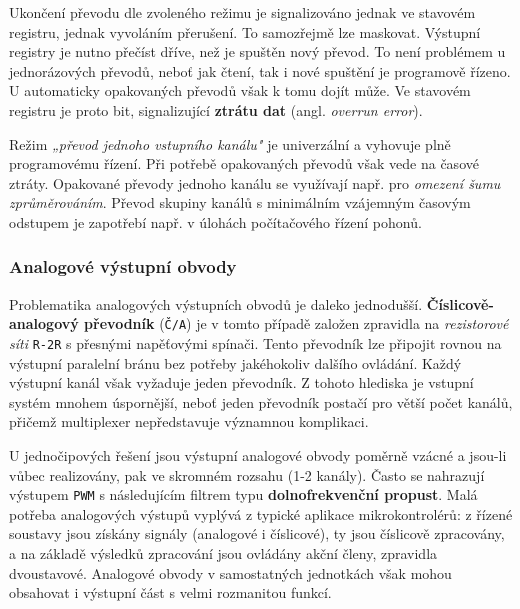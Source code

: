       Ukončení převodu dle zvoleného režimu je signalizováno jednak ve stavovém registru, jednak 
      vyvoláním přerušení. To samozřejmě lze maskovat. Výstupní registry je nutno přečíst dříve, 
      než je spuštěn nový převod. To není problémem u jednorázových převodů, neboť jak čtení, tak i 
      nové spuštění je programově řízeno. U automaticky opakovaných převodů však k tomu dojít může. 
      Ve stavovém registru je proto bit, signalizující \textbf{ztrátu dat} (angl. \emph{overrun 
      error}).
      
      Režim \emph{„převod jednoho vstupního kanálu"} je univerzální a vyhovuje plně programovému 
      řízení. Při potřebě opakovaných převodů však vede na časové ztráty. Opakované převody jednoho 
      kanálu se využívají např. pro \emph{omezení šumu zprůměrováním}. Převod skupiny kanálů s 
      minimálním vzájemným časovým odstupem je zapotřebí např. v úlohách počítačového řízení 
      pohonů.    
      
      \subsubsection{Analogové výstupní obvody}
        Problematika analogových výstupních obvodů je daleko jednodušší. 
        \textbf{Číslicově-analogový převodník} (\texttt{Č/A}) je v tomto případě založen zpravidla 
        na \emph{rezistorové síti} \texttt{R-2R} s přesnými napěťovými spínači. Tento převodník lze 
        připojit rovnou na výstupní paralelní bránu bez potřeby jakéhokoliv dalšího ovládání. Každý 
        výstupní kanál však vyžaduje jeden převodník. Z tohoto hlediska je vstupní systém mnohem 
        úspornější, neboť jeden převodník postačí pro větší počet kanálů, přičemž multiplexer 
        nepředstavuje významnou komplikaci.
        
        U jednočipových řešení jsou výstupní analogové obvody poměrně vzácné a jsou-li vůbec 
        realizovány, pak ve skromném rozsahu (1-2 kanály). Často se nahrazují výstupem \texttt{PWM} 
        s následujícím filtrem typu \textbf{dolnofrekvenční propust}. Malá potřeba analogových 
        výstupů vyplývá z typické aplikace mikrokontrolérů: z řízené soustavy jsou získány signály 
        (analogové i číslicové), ty jsou číslicově zpracovány, a na základě výsledků zpracování 
        jsou ovládány akční členy, zpravidla dvoustavové. Analogové obvody v samostatných 
        jednotkách však mohou obsahovat i výstupní část s velmi rozmanitou funkcí.
\printbibliography[title={Seznam literatury}, heading=subbibliography]
